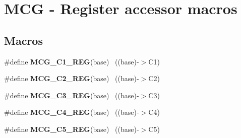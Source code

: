 \hypertarget{group___m_c_g___register___accessor___macros}{}\section{M\+C\+G -\/ Register accessor macros}
\label{group___m_c_g___register___accessor___macros}
\subsection*{Macros}
\begin{DoxyCompactItemize}
\item 
\hypertarget{group___m_c_g___register___accessor___macros_gae34b03d76caea16a8366fb11838560ea}{}\#define {\bfseries M\+C\+G\+\_\+\+C1\+\_\+\+R\+E\+G}(base)                                              ~((base)-\/$>$C1)\label{group___m_c_g___register___accessor___macros_gae34b03d76caea16a8366fb11838560ea}

\item 
\hypertarget{group___m_c_g___register___accessor___macros_ga81f0c07fe9169d8b0d87c8dc497b4732}{}\#define {\bfseries M\+C\+G\+\_\+\+C2\+\_\+\+R\+E\+G}(base)                                              ~((base)-\/$>$C2)\label{group___m_c_g___register___accessor___macros_ga81f0c07fe9169d8b0d87c8dc497b4732}

\item 
\hypertarget{group___m_c_g___register___accessor___macros_ga0a47f442b7ba0665e9536b8d187c2f92}{}\#define {\bfseries M\+C\+G\+\_\+\+C3\+\_\+\+R\+E\+G}(base)                                              ~((base)-\/$>$C3)\label{group___m_c_g___register___accessor___macros_ga0a47f442b7ba0665e9536b8d187c2f92}

\item 
\hypertarget{group___m_c_g___register___accessor___macros_ga8b1f5173fccdea7dfd4e2ea46db8002f}{}\#define {\bfseries M\+C\+G\+\_\+\+C4\+\_\+\+R\+E\+G}(base)                                              ~((base)-\/$>$C4)\label{group___m_c_g___register___accessor___macros_ga8b1f5173fccdea7dfd4e2ea46db8002f}

\item 
\hypertarget{group___m_c_g___register___accessor___macros_gaf5c35c53a6183c707c255e7a9aeaca49}{}\#define {\bfseries M\+C\+G\+\_\+\+C5\+\_\+\+R\+E\+G}(base)                                              ~((base)-\/$>$C5)\label{group___m_c_g___register___accessor___macros_gaf5c35c53a6183c707c255e7a9aeaca49}


\end{DoxyCompactItemize}
